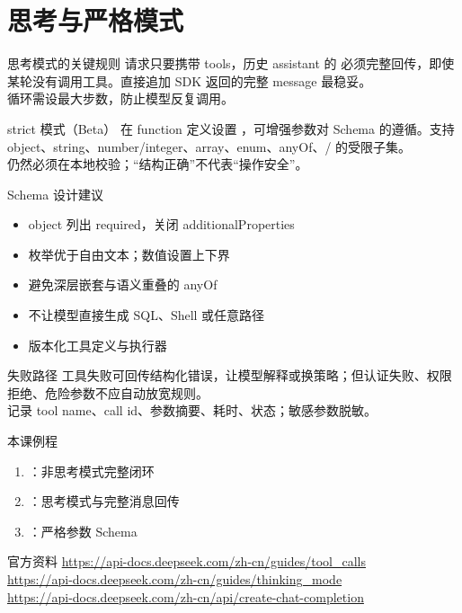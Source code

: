 \documentclass[aspectratio=169,UTF8]{ctexbeamer}
\begin{document}
\section{思考与严格模式}
\begin{frame}{思考模式的关键规则}
请求只要携带 tools，历史 assistant 的  必须完整回传，即使某轮没有调用工具。直接追加 SDK 返回的完整 message 最稳妥。\\[8pt]
循环需设最大步数，防止模型反复调用。
\end{frame}
\begin{frame}{strict 模式（Beta）}
在 function 定义设置 ，可增强参数对 Schema 的遵循。支持 object、string、number/integer、array、enum、anyOf、/ 的受限子集。\\[8pt]
仍然必须在本地校验；“结构正确”不代表“操作安全”。
\end{frame}
\begin{frame}{Schema 设计建议}
\begin{itemize}
  \item object 列出 required，关闭 additionalProperties
  \item 枚举优于自由文本；数值设置上下界
  \item 避免深层嵌套与语义重叠的 anyOf
  \item 不让模型直接生成 SQL、Shell 或任意路径
  \item 版本化工具定义与执行器
\end{itemize}
\end{frame}
\begin{frame}{失败路径}
工具失败可回传结构化错误，让模型解释或换策略；但认证失败、权限拒绝、危险参数不应自动放宽规则。\\[8pt]
记录 tool name、call id、参数摘要、耗时、状态；敏感参数脱敏。
\end{frame}
\begin{frame}{本课例程}
\begin{enumerate}
  \item {}：非思考模式完整闭环
  \item {}：思考模式与完整消息回传
  \item {}：严格参数 Schema
\end{enumerate}
\end{frame}
\begin{frame}{官方资料}
\small
\url{https://api-docs.deepseek.com/zh-cn/guides/tool_calls}\\
\url{https://api-docs.deepseek.com/zh-cn/guides/thinking_mode}\\
\url{https://api-docs.deepseek.com/zh-cn/api/create-chat-completion}
\end{frame}
\end{document}
